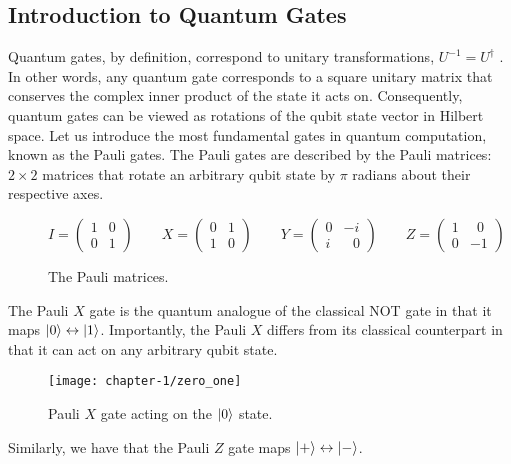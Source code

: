 \subsection{Introduction to Quantum Gates}%
\label{quantum-gates}

Quantum gates, by definition, correspond to unitary transformations, $U^{-1} = U^\dagger$ \cite{Nielsen2012}. In other words, any quantum gate corresponds to a square unitary matrix that conserves the complex inner product of the state it acts on. Consequently, quantum gates can be viewed as rotations of the qubit state vector in Hilbert space. Let us introduce the most fundamental gates in quantum computation, known as the Pauli gates. The Pauli gates are described by the Pauli matrices: $2 \times 2$ matrices that rotate an arbitrary qubit state by $\pi$ radians about their respective axes.

\begin{figure}[H]
    \centering
    \begin{equation*}
        I = \begin{pmatrix} 1 & 0 \\ 0 & 1\end{pmatrix} \qquad
        X = \begin{pmatrix} 0 & 1 \\ 1 & 0\end{pmatrix} \qquad
        Y = \begin{pmatrix} 0 & -i \\ i & \,\,\,\,0\end{pmatrix} \qquad
        Z = \begin{pmatrix} 1 & \,\,\,0 \\ 0 & -1\end{pmatrix}
    \end{equation*}
    \caption{The Pauli matrices.}
    \label{pauli-matrices}
\end{figure}

The Pauli $X$ gate is the quantum analogue of the classical NOT gate in that it maps $\ket 0 \leftrightarrow \ket 1$. Importantly, the Pauli $X$ differs from its classical counterpart in that it can act on any arbitrary qubit state.

\begin{figure}[H]
    \centering
    \texttt{[image: chapter-1/zero\_one]}
    \caption{Pauli $X$ gate acting on the $\ket 0$ state.}
\end{figure}

Similarly, we have that the Pauli $Z$ gate maps $\ket + \leftrightarrow \ket -$.

